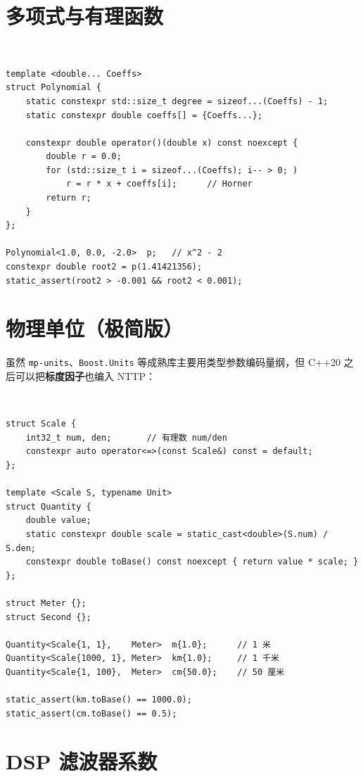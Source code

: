 \documentclass[12pt,a4paper,fontset=fandol]{ctexbook}
\newcommand{\cppxxlabel}[1]{%
  \tcbox[on line,colback=cpp20bg,colframe=cpp20bg,
    boxrule=0pt,arc=1pt,left=2pt,right=2pt,top=1pt,bottom=1pt,
    colupper=white,fontupper=\scriptsize\bfseries]{#1}}
\newcommand{\cpp}[1]{C++#1}
\newcommand{\kw}[1]{\texttt{#1}}
\begin{document}
\section{多项式与有理函数}

\cppxxlabel{C++20}\ \begin{lstlisting}
template <double... Coeffs>
struct Polynomial {
    static constexpr std::size_t degree = sizeof...(Coeffs) - 1;
    static constexpr double coeffs[] = {Coeffs...};

    constexpr double operator()(double x) const noexcept {
        double r = 0.0;
        for (std::size_t i = sizeof...(Coeffs); i-- > 0; )
            r = r * x + coeffs[i];      // Horner
        return r;
    }
};

Polynomial<1.0, 0.0, -2.0>  p;   // x^2 - 2
constexpr double root2 = p(1.41421356);
static_assert(root2 > -0.001 && root2 < 0.001);
\end{lstlisting}

\section{物理单位（极简版）}

虽然 \kw{mp-units}、\kw{Boost.Units} 等成熟库主要用类型参数编码量纲，但 \cpp{20} 之后可以把\textbf{标度因子}也编入 NTTP：

\cppxxlabel{C++20}\ \begin{lstlisting}
struct Scale {
    int32_t num, den;       // 有理数 num/den
    constexpr auto operator<=>(const Scale&) const = default;
};

template <Scale S, typename Unit>
struct Quantity {
    double value;
    static constexpr double scale = static_cast<double>(S.num) / S.den;
    constexpr double toBase() const noexcept { return value * scale; }
};

struct Meter {};
struct Second {};

Quantity<Scale{1, 1},    Meter>  m{1.0};      // 1 米
Quantity<Scale{1000, 1}, Meter>  km{1.0};     // 1 千米
Quantity<Scale{1, 100},  Meter>  cm{50.0};    // 50 厘米

static_assert(km.toBase() == 1000.0);
static_assert(cm.toBase() == 0.5);
\end{lstlisting}

\section{DSP 滤波器系数}
\end{document}
